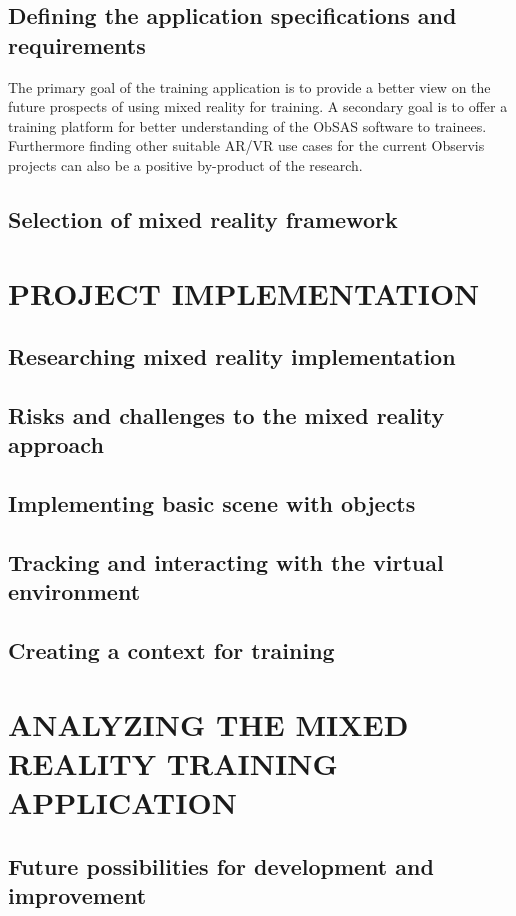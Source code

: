 \documentclass[12pt, a4paper,oneside, nocenter]{thesis}
\begin{document}
\section{Defining the application specifications and requirements}
The primary goal of the training application is to provide a better view on the future prospects of using mixed reality for training. A secondary goal is to offer a training platform for better understanding of the ObSAS software to trainees. Furthermore finding other suitable AR/VR use cases for the current Observis projects can also be a positive by-product of the research.
\par

\section{Selection of mixed reality framework}
\par
\chapter{\MakeUppercase{Project implementation}}
\section{Researching mixed reality implementation}
\section{Risks and challenges to the mixed reality approach}
\section{Implementing basic scene with objects}
\section{Tracking and interacting with the virtual environment}
\section{Creating a context for training}

\par
\chapter{\MakeUppercase{Analyzing the mixed reality training application}}

\section{Future possibilities for development and improvement}


\newpage

\nocite{*}

\end{document}
